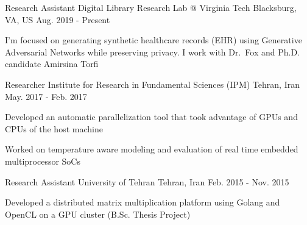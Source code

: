 \begin{cventries}
  \cventry
    {Research Assistant} %
    {Digital Library Research Lab @ Virginia Tech} %
    {Blacksburg, VA, US} %
    {Aug. 2019 - Present} %
    {
      \begin{cvitems} %
        \item {I'm focused on generating synthetic healthcare records (EHR) using Generative Adversarial Networks while preserving privacy. I work with \mbox{Dr. Fox} and Ph.D. candidate Amirsina Torfi}
      \end{cvitems}
    }


  \cventry
    {Researcher} %
    {Institute for Research in Fundamental Sciences (IPM)} %
    {Tehran, Iran} %
    {May. 2017 - Feb. 2017} %
    {
      \begin{cvitems} %
        \item {Developed an automatic parallelization tool that took advantage of GPUs and CPUs of the host machine}
        \item {Worked on temperature aware modeling and evaluation of real time embedded multiprocessor SoCs}
      \end{cvitems}
    }


  \cventry
    {Research Assistant} %
    {University of Tehran} %
    {Tehran, Iran} %
    {Feb. 2015 - Nov. 2015} %
    {
      \begin{cvitems} %
        \item {Developed a distributed matrix multiplication platform using Golang and OpenCL on a GPU cluster (B.Sc. Thesis Project)}
      \end{cvitems}
    }
\end{cventries}
